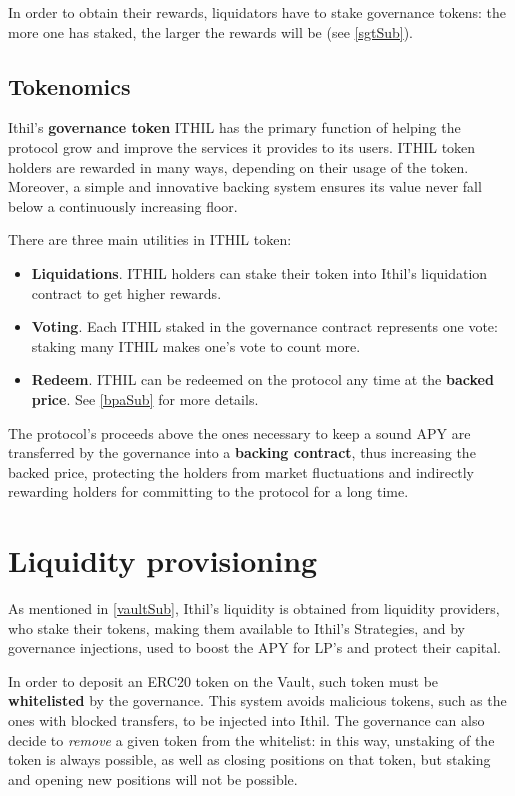 \documentclass[a4paper,10 pt]{article}
\theoremstyle{definition}
\begin{document}
In order to obtain their rewards, liquidators have to stake governance tokens: the more one has staked, the larger the rewards will be (see \ref{sgtSub}).

\subsection{Tokenomics}\label{tokSub}

Ithil's {\bf governance token} ITHIL has the primary function of helping the protocol grow and improve the services it provides to its users. ITHIL token holders are rewarded in many ways, depending on their usage of the token. Moreover, a simple and innovative backing system ensures its value never fall below a continuously increasing floor.

There are three main utilities in ITHIL token:
\begin{itemize}
\item {\bf Liquidations}. ITHIL holders can stake their token into Ithil's liquidation contract to get higher rewards.
\item {\bf Voting}. Each ITHIL staked in the governance contract represents one vote: staking many ITHIL makes one's vote to count more.
\item {\bf Redeem}. ITHIL can be redeemed on the protocol any time at the {\bf backed price}. See \ref{bpaSub} for more details. 
\end{itemize}
The protocol's proceeds above the ones necessary to keep a sound APY are transferred by the governance into a {\bf backing contract}, thus increasing the backed price, protecting the holders from market fluctuations and indirectly rewarding holders for committing to the protocol for a long time.

\newpage 

\section{Liquidity provisioning}\label{liquidityProvSec}
As mentioned in \ref{vaultSub}, Ithil's liquidity is obtained from liquidity providers, who stake their tokens, making them available to Ithil's Strategies, and by governance injections, used to boost the APY for LP's and protect their capital.

In order to deposit an ERC20 token on the Vault, such token must be {\bf whitelisted} by the governance. This system avoids malicious tokens, such as the ones with blocked transfers, to be injected into Ithil. The governance can also decide to {\it remove} a given token from the whitelist: in this way, unstaking of the token is always possible, as well as closing positions on that token, but staking and opening new positions will not be possible.
\end{document}

